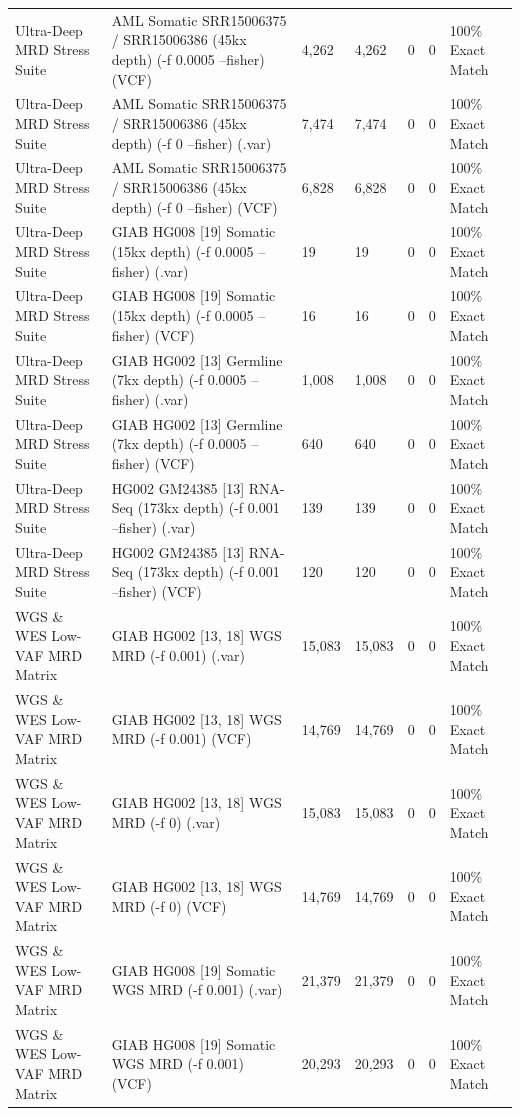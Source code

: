 \begin{table}[htbp]
{\begin{tabular}{lllllll}
Ultra-Deep MRD Stress Suite & AML Somatic SRR15006375 / SRR15006386 (45kx depth) (-f 0.0005 --fisher) (VCF) & 4,262 & 4,262 & 0 & 0 & 100\% Exact Match \\
Ultra-Deep MRD Stress Suite & AML Somatic SRR15006375 / SRR15006386 (45kx depth) (-f 0 --fisher) (.var) & 7,474 & 7,474 & 0 & 0 & 100\% Exact Match \\
Ultra-Deep MRD Stress Suite & AML Somatic SRR15006375 / SRR15006386 (45kx depth) (-f 0 --fisher) (VCF) & 6,828 & 6,828 & 0 & 0 & 100\% Exact Match \\
Ultra-Deep MRD Stress Suite & GIAB HG008 [19] Somatic (15kx depth) (-f 0.0005 --fisher) (.var) & 19 & 19 & 0 & 0 & 100\% Exact Match \\
Ultra-Deep MRD Stress Suite & GIAB HG008 [19] Somatic (15kx depth) (-f 0.0005 --fisher) (VCF) & 16 & 16 & 0 & 0 & 100\% Exact Match \\
Ultra-Deep MRD Stress Suite & GIAB HG002 [13] Germline (7kx depth) (-f 0.0005 --fisher) (.var) & 1,008 & 1,008 & 0 & 0 & 100\% Exact Match \\
Ultra-Deep MRD Stress Suite & GIAB HG002 [13] Germline (7kx depth) (-f 0.0005 --fisher) (VCF) & 640 & 640 & 0 & 0 & 100\% Exact Match \\
Ultra-Deep MRD Stress Suite & HG002 GM24385 [13] RNA-Seq (173kx depth) (-f 0.001 --fisher) (.var) & 139 & 139 & 0 & 0 & 100\% Exact Match \\
Ultra-Deep MRD Stress Suite & HG002 GM24385 [13] RNA-Seq (173kx depth) (-f 0.001 --fisher) (VCF) & 120 & 120 & 0 & 0 & 100\% Exact Match \\
WGS \& WES Low-VAF MRD Matrix & GIAB HG002 [13, 18] WGS MRD (-f 0.001) (.var) & 15,083 & 15,083 & 0 & 0 & 100\% Exact Match \\
WGS \& WES Low-VAF MRD Matrix & GIAB HG002 [13, 18] WGS MRD (-f 0.001) (VCF) & 14,769 & 14,769 & 0 & 0 & 100\% Exact Match \\
WGS \& WES Low-VAF MRD Matrix & GIAB HG002 [13, 18] WGS MRD (-f 0) (.var) & 15,083 & 15,083 & 0 & 0 & 100\% Exact Match \\
WGS \& WES Low-VAF MRD Matrix & GIAB HG002 [13, 18] WGS MRD (-f 0) (VCF) & 14,769 & 14,769 & 0 & 0 & 100\% Exact Match \\
WGS \& WES Low-VAF MRD Matrix & GIAB HG008 [19] Somatic WGS MRD (-f 0.001) (.var) & 21,379 & 21,379 & 0 & 0 & 100\% Exact Match \\
WGS \& WES Low-VAF MRD Matrix & GIAB HG008 [19] Somatic WGS MRD (-f 0.001) (VCF) & 20,293 & 20,293 & 0 & 0 & 100\% Exact Match \\

\end{tabular}}
\end{table}
